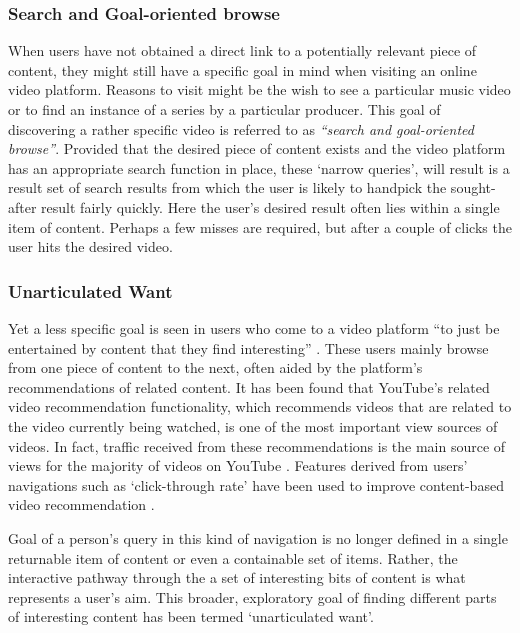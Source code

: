 \subsubsection{Search and Goal-oriented browse}
When users have not obtained a direct link to a potentially relevant piece of content, they might still have a specific goal in mind when visiting an online video platform. Reasons to visit might be the wish to see a particular music video or to find an instance of a series by a particular producer. This goal of discovering a rather specific video is referred to as \emph{``search and goal-oriented browse''}\cite{Davidson:2010tu}. Provided that the desired piece of content exists and the video platform has an appropriate search function in place, these `narrow queries', will result is a result set of search results from which the user is likely to handpick the sought-after result fairly quickly. Here the user's desired result often lies within a single item of content. Perhaps a few misses are required, but after a couple of clicks the user hits the desired video.

\subsubsection{Unarticulated Want}

% 
Yet a less specific goal is seen in users who come to a video platform ``to just be entertained by content that they find interesting'' \cite{Davidson:2010tu}. These users mainly browse from one piece of content to the next, often aided by the platform's recommendations of related content. It has been found that YouTube's related video recommendation functionality, which recommends videos that are related to the video currently being watched, is one of the most important view sources of videos. In fact, traffic received from these recommendations is the main source of views for the majority of videos on YouTube \cite{Zhou:2010ut}. Features derived from users' navigations such as `click-through rate' have been used to improve content-based video recommendation \cite{Yang:2007vb}.

Goal of a person's query in this kind of navigation is no longer defined in a single returnable item of content or even a containable set of items. Rather, the interactive pathway through the a set of interesting bits of content is what represents a user's aim. This broader, exploratory goal of finding different parts of interesting content has been termed `unarticulated want'\cite{Davidson:2010tu}.

